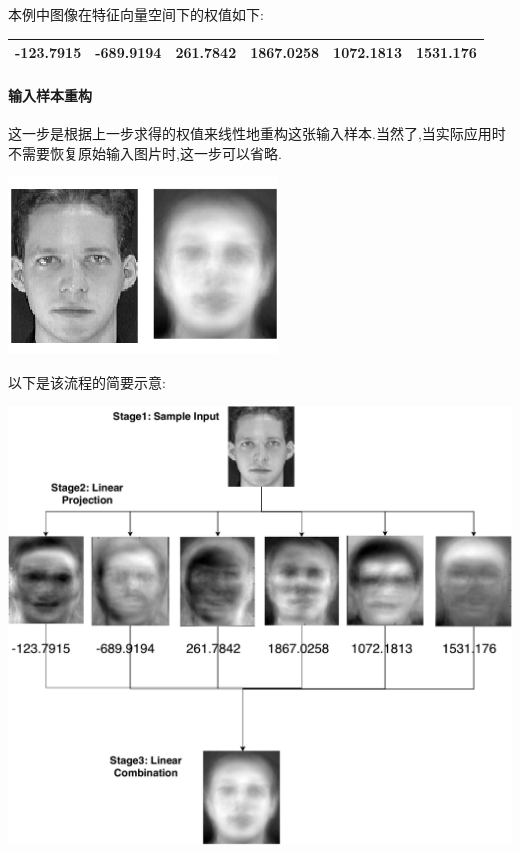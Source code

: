 本例中图像在特征向量空间下的权值如下:
\begin{center}\begin{tabular}{|l|l|l|l|l|l|}
\hline
-123.7915&-689.9194&261.7842&1867.0258&1072.1813&1531.176\\\hline
\end{tabular}
\end{center}

\paragraph{输入样本重构} 这一步是根据上一步求得的权值来线性地重构这张输入样本.当然了,当实际应用时不需要恢复原始输入图片时,这一步可以省略.

\begin{center}
\begin{minipage}[t]{\linewidth}
\center
{
\includegraphics[width=\MyFactor\textwidth]{Img/pca_sample.png} 
}
\end{minipage}
\medskip
\end{center}

	
	以下是该流程的简要示意:
\begin{center}
\begin{minipage}[t]{\linewidth}
\center
{
\includegraphics[width=\textwidth]{Img/pca_demo.pdf} 
}
\end{minipage}
\medskip
\end{center}

